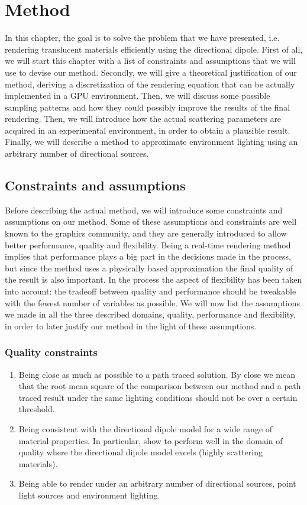 \chapter{Method}
In this chapter, the goal is to solve the problem that we have presented, i.e. rendering translucent materials efficiently using the directional dipole. First of all, we will start this chapter with a list of constraints and assumptions that we will use to devise our method. Secondly, we will give a theoretical justification of our method, deriving a discretization of the rendering equation that can be actually implemented in a GPU environment. Then, we will discuss some possible sampling patterns and how they could possibly improve the results of the final rendering. Then, we will introduce how the actual scattering parameters are acquired in an experimental environment, in order to obtain a plausible result. Finally, we will describe a method to approximate environment lighting using an arbitrary number of directional sources.

\section{Constraints and assumptions}

Before describing the actual method, we will introduce some constraints and assumptions on our method. Some of these assumptions and constraints are well known to the graphics community, and they are generally introduced to allow better performance, quality and flexibility. Being a real-time rendering method implies that performance plays a big part in the decisions made in the process, but since the method uses a physically based approximation the final quality of the result is also important. In the process the aspect of flexibility has been taken into account: the tradeoff between quality and performance should be tweakable with the fewest number of variables as possible. We will now list the assumptions we made in all the three described domains, quality, performance and flexibility, in order to later justify our method in the light of these assumptions. 

\subsection{Quality constraints}
\begin{enumerate}
	\item Being close as much as possible to a path traced solution. By close we mean that the root mean square of the comparison between our method and a path traced result under the same lighting conditions should not be over a certain threshold. 
	\item Being consistent with the directional dipole model for a wide range of material properties. In particular, show to perform well in the domain of quality where the directional dipole model excels (highly scattering materials).
	\item Being able to render under an arbitrary number of directional sources, point light sources and environment lighting.
\end{enumerate}

